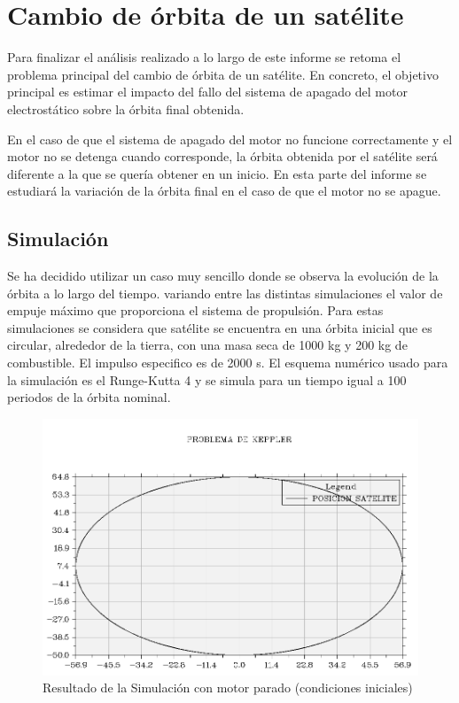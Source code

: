 \documentclass[11pt,singlespacing,liststotoc,headsepline,a4paper]{article}
\begin{document}
\section{Cambio de órbita de un satélite}
Para finalizar el análisis realizado a lo largo de este informe se retoma el problema principal del cambio de órbita de un satélite. En concreto, el objetivo principal es estimar el impacto del fallo del sistema de apagado del motor electrostático sobre la órbita final obtenida.

En el caso de que el sistema de apagado del motor no funcione correctamente y el motor no se detenga cuando corresponde, la órbita obtenida por el satélite será diferente a la que se quería obtener en un inicio. En esta parte del informe se estudiará la variación de la órbita final en el caso de que el motor no se apague.

\subsection{Simulación}
Se ha decidido utilizar un caso muy sencillo donde se observa la evolución de la órbita a lo largo del tiempo. variando entre las distintas simulaciones el valor de empuje máximo que proporciona el sistema de propulsión. Para estas simulaciones se considera que satélite se encuentra en una órbita inicial que es circular, alrededor de la tierra, con una masa seca de 1000 kg y 200 kg de combustible. El impulso especifico es de 2000 s. El esquema numérico usado para la simulación es el Runge-Kutta 4 y se simula para un tiempo igual a 100 periodos de la órbita nominal.

\begin{figure}[H]
	\centering
	\includegraphics[width=1\textwidth]{E=0_100T.png}
	\caption{Resultado de la Simulación con motor parado (condiciones iniciales)}
	\label{E=0}
\end{figure}
\end{document}
